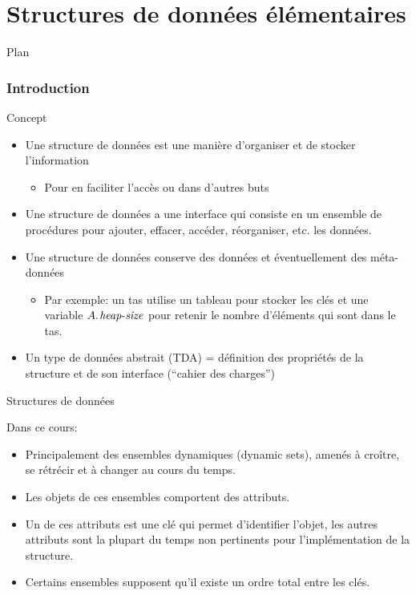 
\part{Structures de données élémentaires}


\begin{frame}{Plan}

\tableofcontents

\end{frame}

\section{Introduction}

\begin{frame}{Concept}
\begin{itemize}
\item Une \alert{structure de données} est une manière d'organiser et de stocker l'information
\begin{itemize}
\item Pour en faciliter l'accès ou dans d'autres buts
\end{itemize}
\item Une structure de données a une \alert{interface} qui consiste en un ensemble de procédures pour ajouter, effacer, accéder, réorganiser, etc. les données.
\item Une structure de données conserve des \alert{données} et éventuellement des \alert{méta-données}
\begin{itemize}
\item Par exemple: un tas utilise un tableau pour stocker les clés et une variable $\attrib{A}{heap-size}$ pour retenir le nombre d'éléments qui sont dans le tas.
\end{itemize}
\item Un type de données abstrait (TDA) = définition des propriétés
  de la structure et de son interface (``cahier des charges'')
\end{itemize}
\end{frame}

\begin{frame}{Structures de données}

Dans ce cours:
\begin{itemize}
\item Principalement des \alert{ensembles dynamiques} (dynamic sets), amenés à croître, se
  rétrécir et à changer au cours du temps.
\item Les objets de ces ensembles comportent des attributs.
\item Un de ces attributs est une \alert{clé} qui permet d'identifier
  l'objet, les autres attributs sont la plupart du temps non
  pertinents pour l'implémentation de la structure.
\item Certains ensembles supposent qu'il existe un \alert{ordre total}
  entre les clés.
\end{itemize}

\end{frame}


